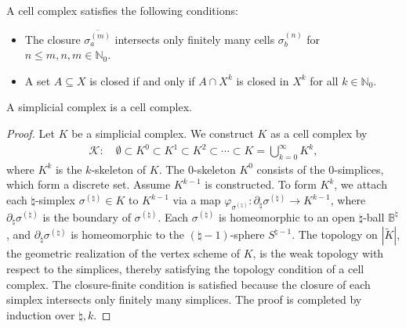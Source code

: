 \begin{remark}
A cell complex satisfies the following conditions:
\begin{itemize}
    \item The closure \(\overline{\sigma^{(m)}_a}\) intersects only finitely many cells \(\sigma^{(n)}_b\) for \(n \leq m, n,m \in \mathbb{N}_0\).
    \item A set \(A \subseteq X\) is closed if and only if \(A \cap X^k\) is closed in \(X^k\) for all \(k \in \mathbb{N}_0\).
\end{itemize}
\end{remark}

\begin{proposition}
A simplicial complex is a cell complex.
\end{proposition}

\begin{proof}
Let \(K\) be a simplicial complex. We construct \(K\) as a cell complex by
\begin{align}
\mathcal{K}: \quad \emptyset \subset K^0 \subset K^1 \subset K^2 \subset \cdots \subset K = \bigcup_{k=0}^{\infty} K^k,
\end{align}
where \(K^k\) is the \(k\)-skeleton of \(K\). The $0$-skeleton \(K^0\) consists of the $0$-simplices, which form a discrete set. Assume \(K^{k-1}\) is constructed. To form \(K^k\), we attach each \(\natural\)-simplex \(\sigma^{(\natural)} \in K\) to \(K^{k-1}\) via a map \(\varphi_{\sigma^{(\natural)}} : \partial_{\natural} \sigma^{(\natural)} \to K^{k-1}\), where \(\partial_{\natural} \sigma^{(\natural)}\) is the boundary of \(\sigma^{(\natural)}\). Each \(\sigma^{(\natural)}\) is homeomorphic to an open \(\natural\)-ball \(\mathbb{B}^{\natural}\), and \(\partial_{\natural} \sigma^{(\natural)}\) is homeomorphic to the \((\natural-1)\)-sphere \(S^{\natural-1}\). The topology on \(|\tilde{K}|\), the geometric realization of the vertex scheme of \(K\), is the weak topology with respect to the simplices, thereby satisfying the topology condition of a cell complex. The closure-finite condition is satisfied because the closure of each simplex intersects only finitely many simplices. The proof is completed by induction over $\natural, k$.
\end{proof}

